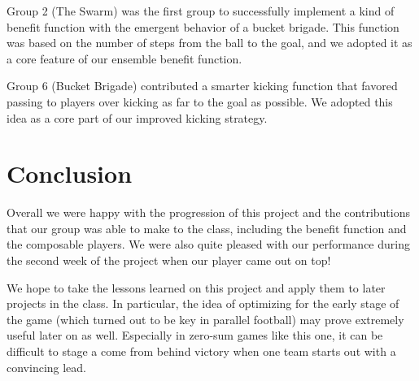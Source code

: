 \documentclass[
10pt, %
letterpaper, %
oneside, %
headinclude,footinclude, %
english
]{article}
\begin{document}
Group 2 (The Swarm) was the first group to successfully implement a kind of benefit function with the emergent behavior of a bucket brigade. This function was based on the number of steps from the ball to the goal, and we adopted it as a core feature of our ensemble benefit function.

Group 6 (Bucket Brigade) contributed a smarter kicking function that favored passing to players over kicking as far to the goal as possible. We adopted this idea as a core part of our improved kicking strategy.

\section{Conclusion}

Overall we were happy with the progression of this project and the contributions that our group was able to make to the class, including the benefit function and the composable players. We were also quite pleased with our performance during the second week of the project when our player came out on top!

We hope to take the lessons learned on this project and apply them to later projects in the class. In particular, the idea of optimizing for the early stage of the game (which turned out to be key in parallel football) may prove extremely useful later on as well. Especially in zero-sum games like this one, it can be difficult to stage a come from behind victory when one team starts out with a convincing lead.
\end{document}
